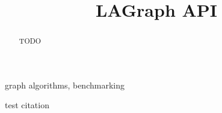 \documentclass[conference]{IEEEtran}
\begin{document}
\title{LAGraph API}

\author{
}

\maketitle

\begin{abstract}
TODO
\end{abstract}

\begin{IEEEkeywords}
graph algorithms, benchmarking 
\end{IEEEkeywords}



test citation~\cite{GxBUserGuide}





\end{document}
